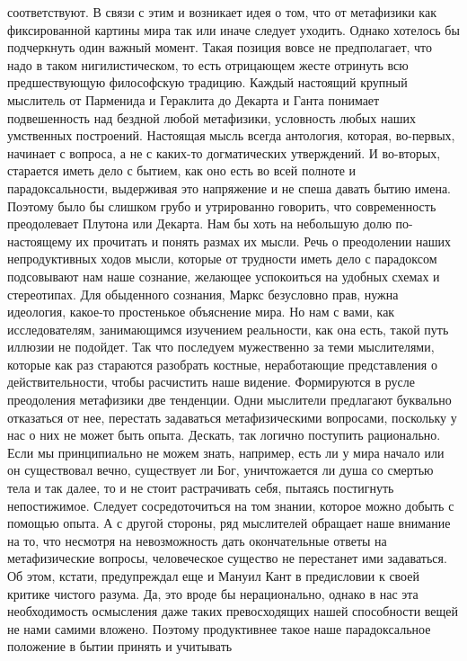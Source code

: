 соответствуют. В связи с этим и возникает идея о том, что от метафизики как
фиксированной картины мира так или иначе следует уходить. Однако хотелось бы
подчеркнуть один важный момент. Такая позиция вовсе не предполагает, что надо в
таком нигилистическом, то есть отрицающем жесте отринуть всю предшествующую
философскую традицию. Каждый настоящий крупный мыслитель от Парменида и
Гераклита до Декарта и Ганта понимает подвешенность над бездной любой
метафизики, условность любых наших умственных построений. Настоящая мысль всегда
антология, которая, во-первых, начинает с вопроса, а не с каких-то догматических
утверждений. И во-вторых, старается иметь дело с бытием, как оно есть во всей
полноте и парадоксальности, выдерживая это напряжение и не спеша давать бытию
имена. Поэтому было бы слишком грубо и утрированно говорить, что современность
преодолевает Плутона или Декарта. Нам бы хоть на небольшую долю по-настоящему их
прочитать и понять размах их мысли. Речь о преодолении наших непродуктивных
ходов мысли, которые от трудности иметь дело с парадоксом подсовывают нам наше
сознание, желающее успокоиться на удобных схемах и стереотипах. Для обыденного
сознания, Маркс безусловно прав, нужна идеология, какое-то простенькое
объяснение мира. Но нам с вами, как исследователям, занимающимся изучением
реальности, как она есть, такой путь иллюзии не подойдет. Так что последуем
мужественно за теми мыслителями, которые как раз стараются разобрать костные,
неработающие представления о действительности, чтобы расчистить наше видение.
Формируются в русле преодоления метафизики две тенденции. Одни мыслители
предлагают буквально отказаться от нее, перестать задаваться метафизическими
вопросами, поскольку у нас о них не может быть опыта. Дескать, так логично
поступить рационально. Если мы принципиально не можем знать, например, есть ли у
мира начало или он существовал вечно, существует ли Бог, уничтожается ли душа со
смертью тела и так далее, то и не стоит растрачивать себя, пытаясь постигнуть
непостижимое. Следует сосредоточиться на том знании, которое можно добыть с
помощью опыта. А с другой стороны, ряд мыслителей обращает наше внимание на то,
что несмотря на невозможность дать окончательные ответы на метафизические
вопросы, человеческое существо не перестанет ими задаваться. Об этом, кстати,
предупреждал еще и Мануил Кант в предисловии к своей критике чистого разума. Да,
это вроде бы нерационально, однако в нас эта необходимость осмысления даже таких
превосходящих нашей способности вещей не нами самими вложено. Поэтому
продуктивнее такое наше парадоксальное положение в бытии принять и учитывать
